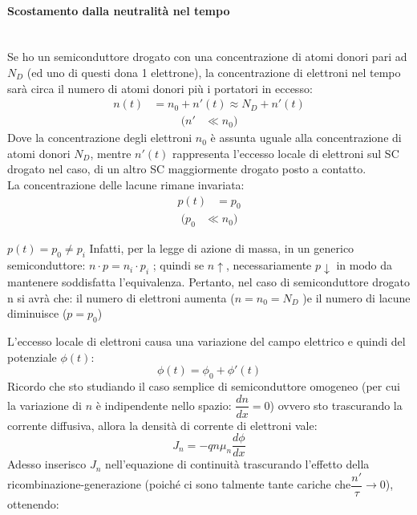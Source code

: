 \paragraph{Scostamento dalla neutralità nel tempo}\mbox{}\\
Se ho un semiconduttore drogato con una concentrazione di atomi donori pari ad $N_D$ (ed uno di questi dona 1 elettrone), la concentrazione di elettroni nel tempo sarà circa il numero di atomi donori più i portatori in eccesso:
%
\begin{align}
    n(t)&=n_0+n'(t)\approx N_D+n'(t)
\end{align}
%
\begin{align*}
    (n'&\ll n_0 )
\end{align*}
%
Dove la concentrazione degli elettroni $n_0$ è assunta uguale alla concentrazione di atomi donori $N_D$, mentre $n'(t)$ rappresenta l'eccesso locale di elettroni sul SC drogato nel caso, di un altro SC maggiormente drogato posto a contatto.\\
La concentrazione delle lacune rimane invariata:
%
\begin{align}
    p(t)&=p_0
\end{align}
%
\begin{align*}
    (p_0&\ll n_0)
\end{align*}
%
\begin{psbox}[ATTENZIONE]
 $p(t)=p_0 \neq p_i$
Infatti, per la legge di azione di massa, in un generico semiconduttore: $n\cdot p=n_i \cdot p_i$ ;
quindi se $n\uparrow$, necessariamente $p\downarrow$ in modo da mantenere soddisfatta l'equivalenza.
Pertanto, nel caso di semiconduttore drogato n si avrà che:
il numero di elettroni aumenta ($n=n_0=N_D$ )e il numero di lacune diminuisce ($p=p_0 $)
\end{psbox}
%
L'eccesso locale di elettroni causa una variazione del campo elettrico e quindi del potenziale $\phi(t)$:
%
\begin{equation}
    \phi(t)=\phi_0+\phi'(t)
\end{equation}
Ricordo che sto studiando il caso semplice di semiconduttore omogeneo (per cui la variazione di $n$ è indipendente nello spazio: $\dfrac{dn}{dx}=0$) ovvero sto trascurando la corrente diffusiva, allora la densità di corrente di elettroni vale: 
%
\begin{equation}
    J_n=-qn \mu_n \dfrac{d\phi}{dx}
\end{equation}
%
Adesso inserisco $J_n$ nell'equazione di continuità trascurando l'effetto della ricombinazione-generazione (poiché ci sono talmente tante cariche che$ \dfrac{n'}{\tau}\rightarrow 0$), ottenendo:
